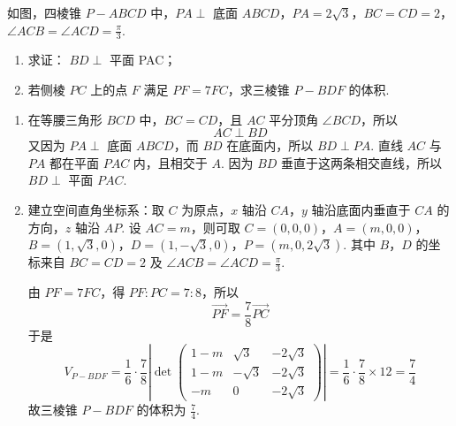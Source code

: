 \begin{problem}
如图，四棱锥 \(P - ABCD\) 中，\(PA \perp\) 底面 \(ABCD\)，\(PA = 2\sqrt{3}\)，\(BC = CD = 2\)，\(\angle ACB = \angle ACD = \frac{\pi}{3}\).
\begin{enumerate}
\item 求证： \( BD \perp \) 平面 PAC；
\item 若侧棱 \(PC\) 上的点 \(F\) 满足 \(PF = 7FC\)，求三棱锥 \(P - BDF\) 的体积.
\end{enumerate}

\begin{solution}
\begin{enumerate}
\item 在等腰三角形 \(BCD\) 中，\(BC=CD\)，且 \(AC\) 平分顶角 \(\angle BCD\)，所以
\[
AC\perp BD
\]
又因为 \(PA\perp\) 底面 \(ABCD\)，而 \(BD\) 在底面内，所以 \(BD\perp PA\). 直线 \(AC\) 与 \(PA\) 都在平面 \(PAC\) 内，且相交于 \(A\). 因为 \(BD\) 垂直于这两条相交直线，所以 \(BD\perp\) 平面 \(PAC\).
\item 建立空间直角坐标系：取 \(C\) 为原点，\(x\) 轴沿 \(CA\)，\(y\) 轴沿底面内垂直于 \(CA\) 的方向，\(z\) 轴沿 \(AP\). 设 \(AC=m\)，则可取
\(C=(0,0,0)\)，\(A=(m,0,0)\)，\(B=(1,\sqrt3,0)\)，\(D=(1,-\sqrt3,0)\)，\(P=(m,0,2\sqrt3)\).
其中 \(B\)，\(D\) 的坐标来自 \(BC=CD=2\) 及 \(\angle ACB=\angle ACD=\frac\pi3\).

由 \(PF=7FC\)，得 \(PF:PC=7:8\)，所以
\[
\overrightarrow{PF}=\frac78\overrightarrow{PC}
\]
于是
\[
V_{P-BDF}
=\frac16\cdot\frac78
\left|\det\begin{pmatrix}
1-m&\sqrt3&-2\sqrt3\\
1-m&-\sqrt3&-2\sqrt3\\
-m&0&-2\sqrt3
\end{pmatrix}\right|
=\frac16\cdot\frac78\times12=\frac74
\]
故三棱锥 \(P-BDF\) 的体积为 \(\frac74\).
\end{enumerate}
\end{solution}
\end{problem}

